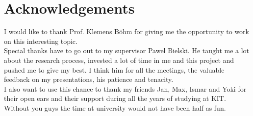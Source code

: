 \chapter{Acknowledgements}
\label{ch:achnowledgements}
I would like to thank Prof. Klemens Böhm for giving me the opportunity to work on this interesting topic. \\

Special thanks have to go out to my supervisor Pawel Bielski. He taught me a lot about the research process, invested a lot of time in me and this project and pushed me to give my best. I think him for all the meetings, the valuable feedback on my presentations, his patience and tenacity.  \\


I also want to use this chance to thank my friends Jan, Max, Ismar and Yoki for their open ears and their support during all the years of studying at KIT. Without you guys the time at university would not have been half as fun. 